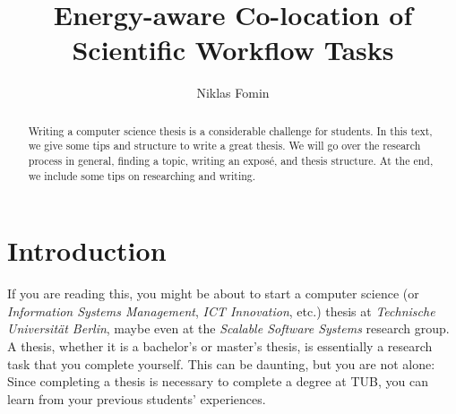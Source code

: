 \documentclass[a4paper]{article}
\title{Energy-aware Co-location of Scientific Workflow Tasks}
\author{Niklas Fomin}
\affil{Distributed and Operating Systems\\Technische Universit\"at Berlin\\Berlin, Germany\\\texttt{niklas.fomin@campus.tu-berlin.de}}
\begin{document}
\maketitle
\begin{abstract}
    Writing a computer science thesis is a considerable challenge for students.
    In this text, we give some tips and structure to write a great thesis.
    We will go over the research process in general, finding a topic, writing an expos\'e, and thesis structure.
    At the end, we include some tips on researching and writing.
\end{abstract}

\section{Introduction}
\label{sec:introduction} 

If you are reading this, you might be about to start a computer science (or \emph{Information Systems Management}, \emph{ICT Innovation}, etc.) thesis at \emph{Technische Universit\"at Berlin}, maybe even at the \emph{Scalable Software Systems} research group.
A thesis, whether it is a bachelor's or master's thesis, is essentially a research task that you complete yourself.
This can be daunting, but you are not alone: Since completing a thesis is necessary to complete a degree at TUB, you can learn from your previous students' experiences.


\cite{10.1145/1341811.1341822}

\printbibliography
\end{document}
